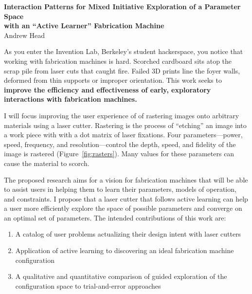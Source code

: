 \documentclass[12pt]{article}
\begin{document}

\begin{center}
  \textbf{Interaction Patterns for Mixed Initiative Exploration of a Parameter Space \\
  with an ``Active Learner'' Fabrication Machine}\\
  \vspace{.5em}
  Andrew Head
\end{center}

As you enter the Invention Lab, Berkeley's student hackerspace, you notice  that working with fabrication machines is hard.
Scorched cardboard sits atop the scrap pile from laser cuts that caught fire.
Failed 3D prints line the foyer walls, deformed from thin supports or improper orientation.
This work seeks to \textbf{improve the efficiency and effectiveness of early, exploratory interactions with fabrication machines.}

I will focus improving the user experience of of rastering images onto arbitrary materials using a laser cutter.
Rastering is the process of ``etching'' an image into a work piece with with a dot matrix of laser fixations.
Four parameters---power, speed, frequency, and resolution---control the depth, speed, and fidelity of the image is rastered (Figure~\ref{fig:rasters}).
Many values for these parameters can cause the material to scorch.

The proposed research aims for a vision for fabrication machines that will be able to assist users in helping them to learn their parameters, models of operation, and constraints.
I propose that a laser cutter that follows active learning can help a user more efficiently explore the space of possible parameters and converge on an optimal set of parameters.
The intended contributions of this work are:
\begin{enumerate}[noitemsep]
\item A catalog of user problems actualizing their design intent with laser cutters
\item Application of active learning to discovering an ideal fabrication machine configuration
\item A qualitative and quantitative comparison of guided exploration of the configuration space to trial-and-error approaches
\end{enumerate}
\end{document}

